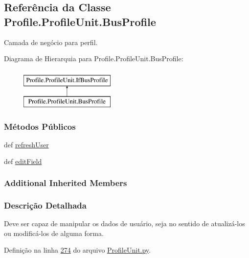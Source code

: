 \hypertarget{classProfile_1_1ProfileUnit_1_1BusProfile}{\subsection{Referência da Classe Profile.\-Profile\-Unit.\-Bus\-Profile}
\label{classProfile_1_1ProfileUnit_1_1BusProfile}
}


Camada de negócio para perfil.  


Diagrama de Hierarquia para Profile.\-Profile\-Unit.\-Bus\-Profile\-:\begin{figure}[H]
\begin{center}
\leavevmode
\includegraphics[height=2.000000cm]{df/da4/classProfile_1_1ProfileUnit_1_1BusProfile}
\end{center}
\end{figure}
\subsubsection*{Métodos Públicos}
\begin{DoxyCompactItemize}
\item 
def \hyperlink{classProfile_1_1ProfileUnit_1_1BusProfile_a87c3d0374f709af7904656938eafd6d3}{refresh\-User}
\item 
def \hyperlink{classProfile_1_1ProfileUnit_1_1BusProfile_a5c116d007081ffefcc1c45cd34c88e10}{edit\-Field}
\end{DoxyCompactItemize}
\subsubsection*{Additional Inherited Members}


\subsubsection{Descrição Detalhada}
Deve ser capaz de manipular os dados de usuário, seja no sentido de atualizá-\/los ou modificá-\/los de alguma forma. 

Definição na linha \hyperlink{ProfileUnit_8py_source_l00274}{274} do arquivo \hyperlink{ProfileUnit_8py_source}{Profile\-Unit.\-py}.



